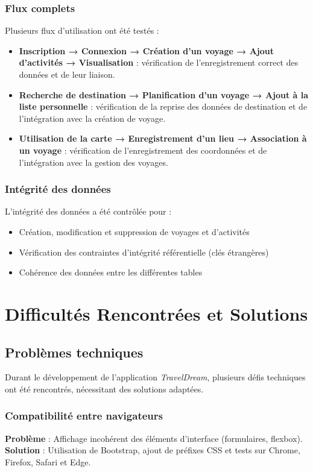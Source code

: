 \documentclass[a4paper,12pt]{article}
\begin{document}
\subsubsection{Flux complets}
Plusieurs flux d’utilisation ont été testés :
\begin{itemize}
  \item \textbf{Inscription → Connexion → Création d’un voyage → Ajout d’activités → Visualisation} : vérification de l’enregistrement correct des données et de leur liaison.
  \item \textbf{Recherche de destination → Planification d’un voyage → Ajout à la liste personnelle} : vérification de la reprise des données de destination et de l’intégration avec la création de voyage.
  \item \textbf{Utilisation de la carte → Enregistrement d’un lieu → Association à un voyage} : vérification de l’enregistrement des coordonnées et de l’intégration avec la gestion des voyages.
\end{itemize}

\subsubsection{Intégrité des données}
L'intégrité des données a été contrôlée pour :
\begin{itemize}
  \item Création, modification et suppression de voyages et d’activités
  \item Vérification des contraintes d'intégrité référentielle (clés étrangères)
  \item Cohérence des données entre les différentes tables
\end{itemize}
\section{Difficultés Rencontrées et Solutions}

\subsection{Problèmes techniques}
Durant le développement de l’application \textit{TravelDream}, plusieurs défis techniques ont été rencontrés, nécessitant des solutions adaptées.

\subsubsection{Compatibilité entre navigateurs}
\textbf{Problème} : Affichage incohérent des éléments d’interface (formulaires, flexbox).\\
\textbf{Solution} : Utilisation de Bootstrap, ajout de préfixes CSS et tests sur Chrome, Firefox, Safari et Edge.
\end{document}
